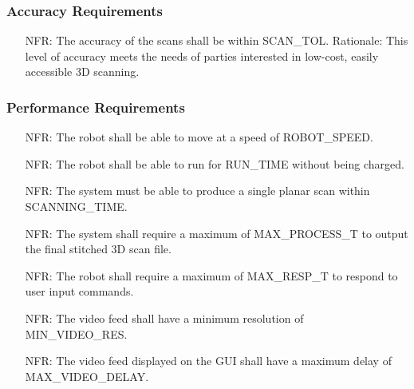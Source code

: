 \documentclass[12pt]{article}
\newcounter{nfrnum} %
\begin{document}
\subsubsection{Accuracy Requirements}
    
\noindent \begin{itemize}
\item[NFR\refstepcounter{nfrnum}\thenfrnum\label{NFR_Accuracy1}:] The accuracy of the scans shall be within SCAN\_TOL. 
\newline Rationale: This level of accuracy meets the needs of parties interested in low-cost, easily accessible 3D scanning.
\end{itemize}

\subsubsection{Performance Requirements}

\noindent \begin{itemize}
\item[NFR\refstepcounter{nfrnum}\thenfrnum\label{NFR_Performance1}:] The robot shall be able to move at a speed of ROBOT\_SPEED.
\item[NFR\refstepcounter{nfrnum}\thenfrnum\label{NFR_Performance2}:] The robot shall be able to run for RUN\_TIME without being charged.
\item[NFR\refstepcounter{nfrnum}\thenfrnum\label{NFR_Performance3}:] The system must be able to produce a single planar scan within SCANNING\_TIME.
\item[NFR\refstepcounter{nfrnum}\thenfrnum\label{NFR_Performance4}:] The system shall require a maximum of MAX\_PROCESS\_T to output the final stitched 3D scan file.
\item[NFR\refstepcounter{nfrnum}\thenfrnum\label{NFR_Performance5}:] The robot shall require a maximum of MAX\_RESP\_T to respond to user input commands.
\item[NFR\refstepcounter{nfrnum}\thenfrnum\label{NFR_Performance6}:] The video feed shall have a minimum resolution of MIN\_VIDEO\_RES.
\item[NFR\refstepcounter{nfrnum}\thenfrnum\label{NFR_Performance7}:] The video feed displayed on the GUI shall have a maximum delay of MAX\_VIDEO\_DELAY.
\end{itemize}
\end{document}
